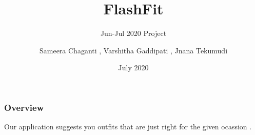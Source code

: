 \documentclass[14pt]{beamer}
\title[Outfit Suggestion App]{FlashFit}
\subtitle{Jun-Jul 2020 Project}
\author[Team 05]{Sameera Chaganti , Varshitha Gaddipati , Jnana Tekumudi}
\date{July 2020}
\begin{document}
\begin{frame}
     \titlepage
\end{frame}

\begin{frame}
    \frametitle{Overview}

    Our application suggests you outfits that are just right for the given ocassion .
\end{frame}
\end{document}

